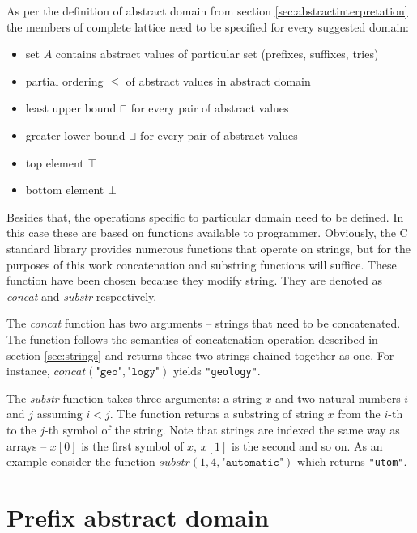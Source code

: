 \documentclass[12pt,final,oneside]{fithesis2}
\theoremstyle{definition}
\begin{document}
As per the definition of abstract domain from section
\ref{sec:abstractinterpretation} the members of complete lattice need to be
specified for every suggested domain:

\begin{itemize}

\item set $A$ contains abstract values of particular set (prefixes,
suffixes, tries)

\item partial ordering $\leq$ of abstract values in abstract domain

\item least upper bound $\sqcap$ for every pair of abstract values

\item greater lower bound $\sqcup$ for every pair of abstract values

\item top element $\top$

\item bottom element $\bot$

\end{itemize}

Besides that, the operations specific to particular domain need to be
defined. In this case these are based on functions available to programmer.
Obviously, the C standard library provides numerous functions that operate
on strings, but for the purposes of this work concatenation and
substring functions will suffice. These function have been chosen because
they modify string. They are denoted as \textit{concat} and
\textit{substr} respectively.

The \textit{concat} function has two arguments -- strings that need to be
concatenated. The function follows the semantics of concatenation
operation described in section \ref{sec:strings} and returns these two
strings chained together as one. For instance,
$\textit{concat}(\texttt{"geo"}, \texttt{"logy"})$ yields \texttt{"geology"}.

The \textit{substr} function takes three arguments: a string $x$ and two
natural numbers $i$ and $j$ assuming $i < j$. The function returns a
substring of string $x$ from the $i$-th to the $j$-th symbol of the string.
Note that strings are indexed the same way as arrays -- $x[0]$ is the first
symbol of $x$, $x[1]$ is the second and so on. As an example consider the
function $\textit{substr}(1, 4, \texttt{"automatic"})$ which returns
\texttt{"utom"}.


\section{Prefix abstract domain}
\end{document}
